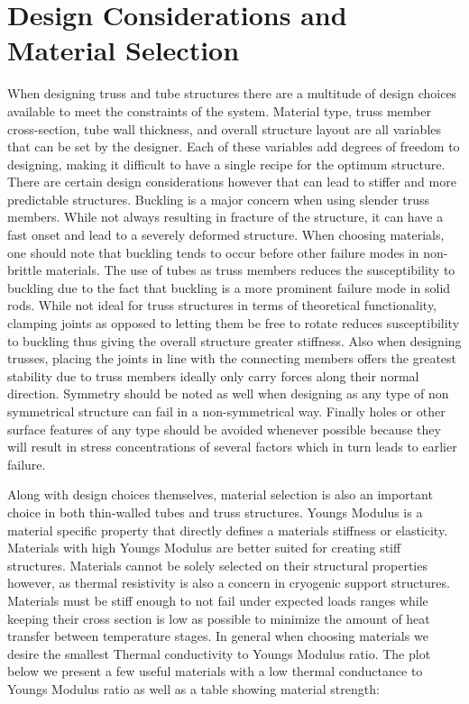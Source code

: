 \documentclass[final]{svjour2}
\begin{document}
\section{Design Considerations and Material Selection}
When designing truss and tube structures there are a multitude of design choices available to meet the constraints of the system.  Material type, truss member cross-section, tube wall thickness, and overall structure layout are all variables that can be set by the designer.  Each of these variables add degrees of freedom to designing, making it difficult to have a single recipe for the optimum structure.  There are certain design considerations however that can lead to stiffer and more predictable structures.  Buckling is a major concern when using slender truss members.  While not always resulting in fracture of the structure, it can have a fast onset and lead to a severely deformed structure.  When choosing materials, one should note that buckling tends to occur before other failure modes in non-brittle materials. The use of tubes as truss members reduces the susceptibility to buckling due to the fact that buckling is a more prominent failure mode in solid rods.  While not ideal for truss structures in terms of theoretical functionality, clamping joints as opposed to letting them be free to rotate reduces susceptibility to buckling thus giving the overall structure greater stiffness. Also when designing trusses, placing the joints in line with the connecting members offers the greatest stability due to truss members ideally only carry forces along their normal direction.  Symmetry should be noted as well when designing as any type of non symmetrical structure can fail in a non-symmetrical way.  Finally holes or other surface features of any type should be avoided whenever possible because they will result in stress concentrations of several factors which in turn leads to earlier failure.  

Along with design choices themselves, material selection is also an important  choice in both thin-walled tubes and truss structures. Youngs Modulus is a material specific property that directly defines a materials stiffness or elasticity.  Materials with high Youngs Modulus are better suited for creating stiff structures. Materials cannot be solely selected on their structural properties however, as thermal resistivity is also a concern in cryogenic support structures.  Materials must be stiff enough to not fail under expected loads ranges while keeping their cross section is low as possible to minimize the amount of heat transfer between temperature stages.  In general when choosing materials we desire the smallest Thermal conductivity to Youngs Modulus ratio.  The plot below we present a few useful materials with a low thermal conductance to Youngs Modulus ratio as well as a table showing material strength:
\end{document}
